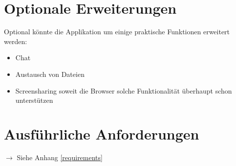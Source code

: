 	\section{Optionale Erweiterungen}
		Optional könnte die Applikation um einige praktische Funktionen erweitert werden:		
		\begin{itemize}
			\item Chat
			\item Austausch von Dateien
			\item Screensharing soweit die Browser solche Funktionalität überhaupt schon unterstützen
		\end{itemize}
		
	\section{Ausführliche Anforderungen}
		$\rightarrow$ Siehe Anhang \ref{requirements}